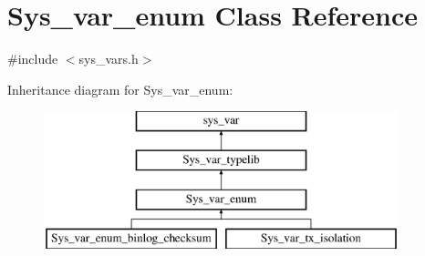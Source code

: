 \hypertarget{classSys__var__enum}{}\section{Sys\+\_\+var\+\_\+enum Class Reference}
\label{classSys__var__enum}


{\ttfamily \#include $<$sys\+\_\+vars.\+h$>$}

Inheritance diagram for Sys\+\_\+var\+\_\+enum\+:\begin{figure}[H]
\begin{center}
\leavevmode
\includegraphics[height=4.000000cm]{classSys__var__enum}
\end{center}
\end{figure}
